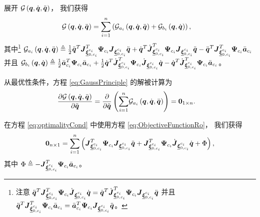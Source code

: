 展开 $\mathcal{G}\left(\boldsymbol{q},\dot{\boldsymbol{q}},\ddot{\boldsymbol{q}}\right)$，
我们获得
\begin{align}
\mathcal{G}\left(\boldsymbol{q},\dot{\boldsymbol{q}},\ddot{\boldsymbol{q}}\right) & =\underset{i=1}{\sum^{n}}\left(\mathcal{G}_{a_{i}}\left(\boldsymbol{q},\dot{\boldsymbol{q}},\ddot{\boldsymbol{q}}\right)+\mathcal{G}_{b_{i}}\left(\boldsymbol{q},\dot{\boldsymbol{q}}\right)\right),\label{eq:ObjectiveFunctionRo}
\end{align}
其中\footnote{注意 $\ddot{\boldsymbol{q}}^{T}\boldsymbol{J}_{\underline{\boldsymbol{\xi}}_{0,c_{i}}^{c_{i}}}^{T}\boldsymbol{\Psi}_{c_{i}}\dot{\boldsymbol{J}}_{\underline{\boldsymbol{\xi}}_{0,c_{i}}^{c_{i}}}\dot{\boldsymbol{q}}=\dot{\boldsymbol{q}}^{T}\dot{\boldsymbol{J}}_{\underline{\boldsymbol{\xi}}_{0,c_{i}}^{c_{i}}}^{T}\boldsymbol{\Psi}_{c_{i}}\boldsymbol{J}_{\underline{\boldsymbol{\xi}}_{0,c_{i}}^{c_{i}}}\ddot{\boldsymbol{q}}$
并且 $\ddot{\boldsymbol{q}}^{T}\boldsymbol{J}_{\underline{\boldsymbol{\xi}}_{0,c_{i}}^{c_{i}}}^{T}\boldsymbol{\Psi}_{c_{i}}\bar{\boldsymbol{a}}_{c_{i}}=\bar{\boldsymbol{a}}_{c_{i}}^{T}\boldsymbol{\Psi}_{c_{i}}\boldsymbol{J}_{\underline{\boldsymbol{\xi}}_{0,c_{i}}^{c_{i}}}\ddot{\boldsymbol{q}}$。} $\mathcal{G}_{a_{i}}\left(\boldsymbol{q},\dot{\boldsymbol{q}},\ddot{\boldsymbol{q}}\right)\triangleq\frac{1}{2}\ddot{\boldsymbol{q}}^{T}\boldsymbol{J}_{\underline{\boldsymbol{\xi}}_{0,c_{i}}^{c_{i}}}^{T}\boldsymbol{\Psi}_{c_{i}}\boldsymbol{J}_{\underline{\boldsymbol{\xi}}_{0,c_{i}}^{c_{i}}}\ddot{\boldsymbol{q}}+\dot{\boldsymbol{q}}^{T}\dot{\boldsymbol{J}}_{\underline{\boldsymbol{\xi}}_{0,c_{i}}^{c_{i}}}^{T}\boldsymbol{\Psi}_{c_{i}}\boldsymbol{J}_{\underline{\boldsymbol{\xi}}_{0,c_{i}}^{c_{i}}}\ddot{\boldsymbol{q}}-\ddot{\boldsymbol{q}}^{T}\boldsymbol{J}_{\underline{\boldsymbol{\xi}}_{0,c_{i}}^{c_{i}}}^{T}\boldsymbol{\Psi}_{c_{i}}\bar{\boldsymbol{a}}_{c_{i}}$
并且 $\mathcal{G}_{b_{i}}\left(\boldsymbol{q},\dot{\boldsymbol{q}}\right)\triangleq\frac{1}{2}\bar{\boldsymbol{a}}_{c_{i}}^{T}\boldsymbol{\Psi}_{c_{i}}\bar{\boldsymbol{a}}_{c_{i}}+\frac{1}{2}\dot{\boldsymbol{q}}^{T}\dot{\boldsymbol{J}}_{\underline{\boldsymbol{\xi}}_{0,c_{i}}^{c_{i}}}^{T}\boldsymbol{\Psi}_{c_{i}}\dot{\boldsymbol{J}}_{\underline{\boldsymbol{\xi}}_{0,c_{i}}^{c_{i}}}\dot{\boldsymbol{q}}-\dot{\boldsymbol{q}}^{T}\dot{\boldsymbol{J}}_{\underline{\boldsymbol{\xi}}_{0,c_{i}}^{c_{i}}}^{T}\boldsymbol{\Psi}_{c_{i}}\bar{\boldsymbol{a}}_{c_{i}}$。

从最优性条件，方程 \eqref{eq:GaussPrinciple} 的解被计算为 \cite{Wieber2006}
\begin{align}
\frac{\partial\mathcal{G}\left(\boldsymbol{q},\dot{\boldsymbol{q}},\ddot{\boldsymbol{q}}\right)}{\partial\ddot{\boldsymbol{q}}} & =\frac{\partial}{\partial\ddot{\boldsymbol{q}}}\left(\underset{i=1}{\sum^{n}}\mathcal{G}_{a_{i}}\left(\boldsymbol{q},\dot{\boldsymbol{q}},\ddot{\boldsymbol{q}}\right)\right)=\boldsymbol{0}_{1\times n}.\label{eq:optimalityCond}
\end{align}

在方程 \eqref{eq:optimalityCond} 中使用方程 \eqref{eq:ObjectiveFunctionRo}，
我们获得
\begin{gather}
\boldsymbol{0}_{n\times1}=\underset{i=1}{\sum^{n}}\left(\boldsymbol{J}_{\underline{\boldsymbol{\xi}}_{0,c_{i}}^{c_{i}}}^{T}\boldsymbol{\Psi}_{c_{i}}\boldsymbol{J}_{\underline{\boldsymbol{\xi}}_{0,c_{i}}^{c_{i}}}\ddot{\boldsymbol{q}}+\boldsymbol{J}_{\underline{\boldsymbol{\xi}}_{0,c_{i}}^{c_{i}}}^{T}\boldsymbol{\Psi}_{c_{i}}\dot{\boldsymbol{J}}_{\underline{\boldsymbol{\xi}}_{0,c_{i}}^{c_{i}}}\dot{\boldsymbol{q}}+\Phi\right),\label{eq:JacZero}
\end{gather}
其中 $\Phi\triangleq-\boldsymbol{J}_{\underline{\boldsymbol{\xi}}_{0,c_{i}}^{c_{i}}}^{T}\boldsymbol{\Psi}_{c_{i}}\bar{\boldsymbol{a}}_{c_{i}}$。

